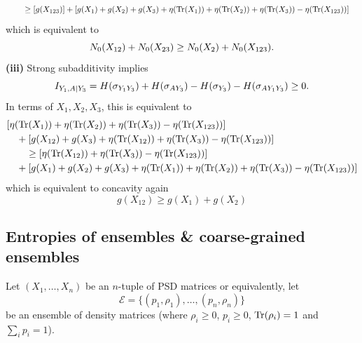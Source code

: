 \documentclass[notitlepage, 10pt]{article}
\begin{document}
{\begin{align}
\begin{split}
        &\qquad\geq [g(X_{123})] 
        +[g(X_{1})+ g(X_{2})+ g(X_{3})+\eta(\operatorname{Tr}(X_1)) + \eta(\operatorname{Tr}(X_2)) + \eta(\operatorname{Tr}(X_3)) - \eta(\operatorname{Tr}(X_{123}))]
    \end{split}
\end{align}
which is equivalent to
\begin{equation}
     N_0(X_{12}) + N_0(X_{23}) \geq N_0(X_{2}) + N_0(X_{123}).
\end{equation}
\textbf{(iii)} 
Strong subadditivity implies
\begin{equation}
    I_{Y_1,A|Y_3} = H(\sigma_{Y_1Y_3}) + H(\sigma_{AY_3}) - H(\sigma_{Y_3}) - H(\sigma_{AY_1Y_3}) \geq 0.
\end{equation}
In terms of $X_1,X_2,X_3$, this is equivalent to
\begin{align}
    \begin{split}
        &[\eta(\operatorname{Tr}(X_1)) + \eta(\operatorname{Tr}(X_2)) + \eta(\operatorname{Tr}(X_3)) - \eta(\operatorname{Tr}(X_{123}))] \\
        &\quad+[g(X_{12}) + g(X_{3}) + \eta(\operatorname{Tr}(X_{12})) + \eta(\operatorname{Tr}(X_{3})) - \eta(\operatorname{Tr}(X_{123}))]\\
        &\qquad\geq [\eta(\operatorname{Tr}(X_{12})) + \eta(\operatorname{Tr}(X_{3})) - \eta(\operatorname{Tr}(X_{123}))] \\
        &\quad+[g(X_{1})+ g(X_{2})+ g(X_{3})+\eta(\operatorname{Tr}(X_1)) + \eta(\operatorname{Tr}(X_2)) + \eta(\operatorname{Tr}(X_3)) - \eta(\operatorname{Tr}(X_{123}))]
    \end{split}
\end{align}
which is equivalent to concavity again
\begin{equation}
    g(X_{12}) \geq g(X_{1})+ g(X_{2})
\end{equation}
}

\subsection{Entropies of ensembles \& coarse-grained ensembles}

Let $(X_1, \ldots, X_n)$ be an $n$-tuple of PSD matrices or equivalently, let 
\begin{equation}
    \label{eq:n_ensemble_states}
    \mathcal E = \{ (p_1, \rho_1), \ldots, (p_n, \rho_n) \} 
\end{equation}
be an ensemble of density matrices (where $\rho_i \geq 0$, $p_i \geq 0$, $\operatorname{Tr}(\rho_i) = 1$ and $\sum_i p_i = 1$).
\end{document}
